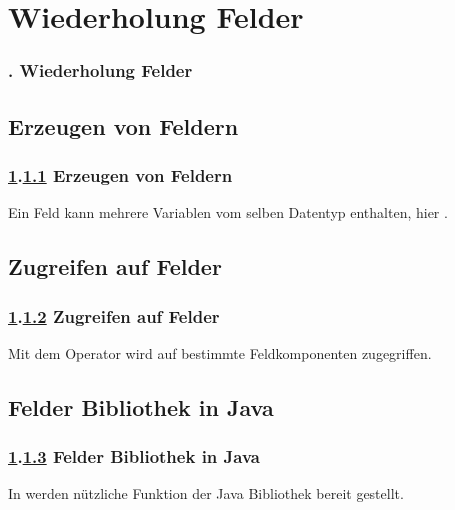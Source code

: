 \def\stitle{Wiederholung Felder}
\section{\stitle}\label{K:wdh}
\begin{frame}
  \frametitle{\kap. \stitle}%
\tableofcontents[current]
\end{frame}

\def\stitle{Erzeugen von Feldern}
\subsection{\stitle}\label{S:Erzeugen}
\begin{frame}[t]%
  \frametitle{\ref{K:wdh}.\ref{S:Erzeugen} \stitle}


Ein Feld kann mehrere Variablen vom selben Datentyp enthalten, hier .


\end{frame}


\def\stitle{Zugreifen auf Felder}
\subsection{\stitle}\label{S:Zugreifen}
\begin{frame}[t]%
  \frametitle{\ref{K:wdh}.\ref{S:Zugreifen} \stitle}

Mit dem Operator \code{[]} wird auf bestimmte Feldkomponenten zugegriffen.


\end{frame}

\def\stitle{Felder Bibliothek in Java}
\subsection{\stitle}\label{S:bequem}
\begin{frame}[t]%
  \frametitle{\ref{K:wdh}.\ref{S:bequem} \stitle}

In  werden n\"utzliche Funktion der Java Bibliothek bereit gestellt.


\end{frame}


